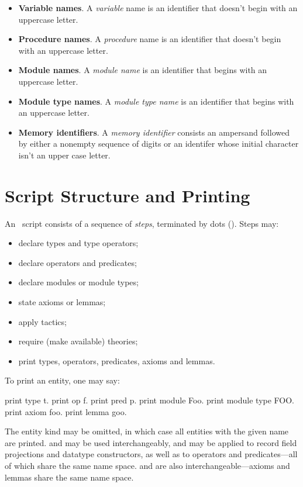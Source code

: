 \begin{itemize}
\item \textbf{Variable names}. A \emph{variable} name is an identifier
  that doesn't begin with an uppercase letter.

\item \textbf{Procedure names}. A \emph{procedure} name is an identifier
  that doesn't begin with an uppercase letter.

\item \textbf{Module names}. A \emph{module name} is an identifier that
  begins with an uppercase letter.

\item \textbf{Module type names}. A \emph{module type name} is an
  identifier that begins with an uppercase letter.

\item \textbf{Memory identifiers}. A \emph{memory identifier} consists
  an ampersand followed by either a nonempty sequence of digits or an
  identifer whose initial character isn't an upper case letter.
\end{itemize}

\section{Script Structure and Printing}

An \EasyCrypt\ script consists of a sequence of \emph{steps},
terminated by dots (). Steps may:
\begin{itemize}
\item declare types and type operators;

\item declare operators and predicates;

\item declare modules or module types;

\item state axioms or lemmas;

\item apply tactics;

\item require (make available) theories;

\item print types, operators, predicates, axioms and lemmas.
\end{itemize}

To print an entity, one may say:
\begin{easycrypt}{}{}
print type t.
print op f.
print pred p.
print module Foo.
print module type FOO.
print axiom foo.
print lemma goo.
\end{easycrypt}
The entity kind may be omitted, in which case all entities with the
given name are printed.  and  may be used
interchangeably, and may be applied to record field projections and
datatype constructors, as well as to operators and predicates---all of which
share the same name space.
 and  are also interchangeable---axioms
and lemmas share the same name space.

